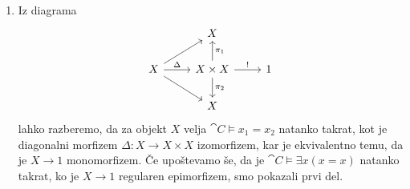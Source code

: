 \documentclass[../kategoricna_logika.tex]{subfiles}
\begin{document}
  \begin{dokaz}
    \begin{enumerate}[label=(\roman*)]
    \item Iz diagrama
      \begin{equation*}
        \begin{tikzcd}[row sep=normal]
          & X & \\
          X \ar[ur] \ar[r, "\Delta"] \ar[dr] & X \times X \ar[u, "\pi_1"'] \ar[d, "\pi_2"] \ar[r, "!"] & 1 \\
          & X &
        \end{tikzcd}
      \end{equation*}
      lahko razberemo, da za objekt $X$ velja
      $\cat{C} \models x_1 = x_2$ natanko takrat, kot je diagonalni
      morfizem $\Delta : X \to X \times X$ izomorfizem, kar je
      ekvivalentno temu, da je $X \to 1$ monomorfizem.  Če upoštevamo
      še, da je $\cat{C} \models \exists x (x = x)$ natanko takrat, ko
      je $X \to 1$ regularen epimorfizem, smo pokazali prvi del.
      

\end{enumerate}
\end{dokaz}
\end{document}
